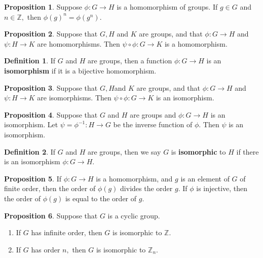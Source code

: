 \documentclass[12pt, a4paper]{article}
\newcommand{\bb}[1]{\mathbb{#1}}
\theoremstyle{definition}
\newtheorem{definition}{Definition}[section]
\newtheorem{proposition}{Proposition}
\theoremstyle{plain}
\begin{document}
\begin{proposition}\label{prop:powers in h-morph}
Suppose $\phi : G \to H$ is a homomorphism of groups. If $g\in G$ and $n\in \bb{Z},$ then $\phi(g)^n =\phi(g^n).$
\end{proposition}

\begin{proposition}
Suppose that $G, H$ and $K$ are groups, and that $\phi : G\to H$ and $\psi:H\to K$ are homomorphisms. Then $\psi\circ \phi:G\to K$ is a homomorphism.
\end{proposition}

\begin{definition}
If $G$ and $H$ are groups, then a function $\phi : G \to H$ is an \textbf{isomorphism} if it is a bijective homomorphism.
\end{definition}

\begin{proposition}
Suppose that $G, H $and $K$ are groups, and that $\phi : G\to H$ and $\psi:H\to K$ are isomorphisms. Then $\psi\circ\phi:G\to K$ is an isomorphism.
\end{proposition}

\begin{proposition}
Suppose that $G$ and $H$ are groups and $\phi : G \to H$ is an isomorphism. Let $\psi = \phi^{-1} : H \to G$ be the inverse function of $\phi.$ Then $\psi$ is an isomorphism.
\end{proposition}

\begin{definition}
If $G$ and $H$ are groups, then we say $G$ is \textbf{isomorphic} to $H$ if there is an isomorphism $\phi:G\to H.$
\end{definition}

\begin{proposition}
If $\phi: G \to H$ is a homomorphism, and $g$ is an element of $G$ of finite order, then the order of $\phi(g)$ divides the order $g$. If $\phi$ is injective, then the order of $\phi(g)$ is equal to the order of $g.$
\end{proposition}

\begin{proposition}
Suppose that $G$ is a cyclic group.
\begin{enumerate}
	
	\item If $G$ has infinite order, then $G$ is isomorphic to $\bb{Z}.$

	\item If $G$ has order $n,$ then $G$ is isomorphic to $\bb{Z}_n.$

\end{enumerate}
\end{proposition}
\end{document}
